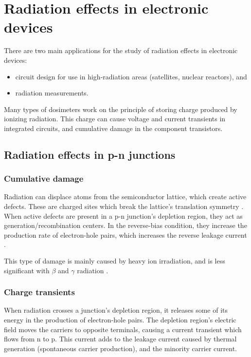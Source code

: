 \section{Radiation effects in electronic devices}
There are two main applications for the study of radiation effects in electronic devices:
\begin{itemize}
    \item circuit design for use in high-radiation areas (satellites, nuclear reactors), and
    \item radiation measurements.
\end{itemize}
Many types of dosimeters work on the principle of storing charge
produced by ionizing radiation.
This charge can cause voltage and current transients in integrated circuits,
and cumulative damage in the component transistors.

\subsection{Radiation effects in p-n junctions}
\subsubsection{Cumulative damage}
Radiation can displace atoms from the semiconductor lattice,
which create active defects.
These are charged sites which break the lattice's translation symmetry
\cite{iniewski_radiation_2011}.
When active defects are present in a p-n junction's depletion region,
they act as generation/recombination centers.
In the reverse-bias condition, they increase the production rate of electron-hole pairs,
which increases the reverse leakage current
.

This type of damage is mainly caused by heavy ion irradiation,
and is less significant with $\beta$ and $\gamma$ radiation
\cite{knoll_radiation_2010}%
\cite{liu_electron_1971}.
\subsubsection{Charge transients}
\label{latchup}
When radiation crosses a junction's depletion region,
it releases some of its energy in the production of electron-hole pairs.
The depletion region's electric field
moves the carriers to opposite terminals,
causing a current transient which flows from n to p.
This current adds to the leakage current caused by thermal generation
(spontaneous carrier production),
and the minority carrier current.


